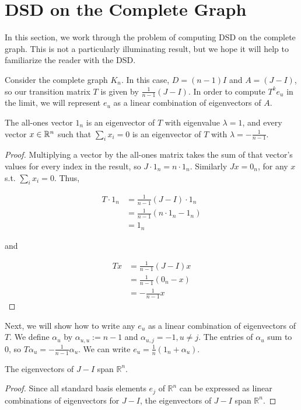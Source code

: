 \section{DSD on the Complete Graph}

In this section, we work through the problem of computing DSD on the complete graph. This is not a
particularly illuminating result, but we hope it will help to familiarize the reader with the DSD.

Consider the complete graph $K_n$. In this case, $D = (n-1)I$ and $A = (J - I)$, so our transition
matrix $T$ is given by $\frac{1}{n-1}(J-I)$. In order to compute $T^ke_u$ in the limit, we will
represent $e_u$ as a linear combination of eigenvectors of $A$.

\begin{proposition}
  The all-ones vector $1_n$ is an eigenvector of $T$ with eigenvalue $\lambda = 1$, and every
  vector $x \in \mathbb{R}^n$ such that $\sum_i x_i = 0$ is an eigenvector of $T$ with
  $\lambda = -\frac{1}{n-1}$.
\end{proposition}
\begin{proof}
  Multiplying a vector by the all-ones matrix takes the sum of that vector's
  values for every index in the result, so $J \cdot 1_n = n \cdot 1_n$.
  Similarly $Jx = 0_n$, for any $x$ s.t. $\sum_i x_i = 0$. Thus,

  \begin{align*}
    T\cdot 1_n &= \frac{1}{n-1}(J-I) \cdot 1_n \\
               &= \frac{1}{n-1}(n\cdot 1_n - 1_n) \\
               &= 1_n
  \end{align*}

  and

  \begin{align*}
    Tx &= \frac{1}{n-1}(J-I)x \\
       &= \frac{1}{n-1}(0_n - x) \\
       &= -\frac{1}{n-1}x
  \end{align*}
\end{proof}


Next, we will show how to write any $e_u$ as a linear combination of
eigenvectors of $T$. We define $\alpha_u$ by $\alpha_{u,u} := n-1$ and
$\alpha_{u,j} = -1, u\neq j$. The entries of $\alpha_u$ sum to $0$, so
$T\alpha_u=-\frac{1}{n-1}\alpha_u$. We can write
$e_u = \frac{1}{n}(1_n + \alpha_u)$.

\begin{corollary}
  The eigenvectors of $J-I$ span $\mathbb{R}^n$.
\end{corollary}
\begin{proof}
  Since all standard basis elements $e_j$ of $\mathbb{R}^n$ can be expressed as linear
  combinations of eigenvectors for $J-I$, the eigenvectors of $J-I$ span $\mathbb{R}^n$.
\end{proof}

